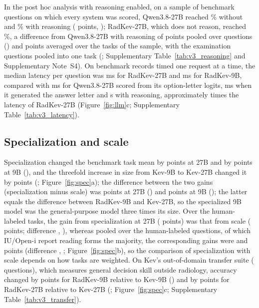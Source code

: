 In the post hoc analysis with reasoning enabled, on a sample of  benchmark questions on which every system was scored, Qwen3.8-27B reached \% without and \% with reasoning ( points, ); RadKev-27B, which does not reason, reached \%, a difference from Qwen3.8-27B with reasoning of  points pooled over questions () and  points averaged over the  tasks of the sample, with the examination questions pooled into one task (; Supplementary Table~\ref{tab:v3_reasoning} and Supplementary Note~S4).
On  benchmark records timed one request at a time, the median latency per question was  ms for RadKev-27B and  ms for RadKev-9B, compared with  ms for Qwen3.8-27B scored from its option-letter logits,  ms when it generated the answer letter and  s with reasoning, approximately  times the latency of RadKev-27B (Figure~\ref{fig:llm}c; Supplementary Table~\ref{tab:v3_latency}). %

\FloatBarrier
\subsection{Specialization and scale}\label{sec:res_spec}

Specialization changed the benchmark task mean by  points at 27B and by  points at 9B (), and the threefold increase in size from Kev-9B to Kev-27B changed it by  points (; Figure~\ref{fig:spec}a); the difference between the two gains (specialization minus scale) was  points at 27B () and  points at 9B (); the latter equals the difference between RadKev-9B and Kev-27B, so the specialized 9B model was  the general-purpose model three times its size. %
Over the human-labeled tasks, the gain from specialization at 27B ( points) was  that from scale ( points; difference , ), whereas pooled over the human-labeled questions, of which IU/Open-i report reading forms the majority, the corresponding gains were  and  points (difference , ; Figure~\ref{fig:spec}b), so the comparison of specialization with scale depends on how tasks are weighted. %
On Kev's out-of-domain transfer suite ( questions), which measures general decision skill outside radiology, accuracy changed by  points for RadKev-9B relative to Kev-9B () and by  points for RadKev-27B relative to Kev-27B (; Figure~\ref{fig:spec}c; Supplementary Table~\ref{tab:v3_transfer}).

